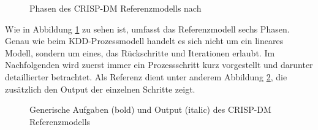 \begin{figure}[H]
\centering
{}
\caption{Phasen des CRISP-DM Referenzmodells nach \citep[S.~10]{chapman_crisp-dm_2000}}
\label{fig:CRISP_DM}
\end{figure}

Wie in Abbildung \ref{fig:CRISP_DM} zu sehen ist, umfasst das Referenzmodell sechs Phasen. Genau wie beim KDD-Prozessmodell handelt es sich nicht um ein lineares Modell, sondern um eines, das Rückschritte und Iterationen erlaubt. Im Nachfolgenden wird zuerst immer ein Prozessschritt kurz vorgestellt und darunter detaillierter betrachtet. Als Referenz dient unter anderem Abbildung \ref{fig:CRISP_DM_detailed}, die zusätzlich den Output der einzelnen Schritte zeigt.

\begin{figure}[H]
\centering
{}
\caption{Generische Aufgaben (bold) und Output (italic) des CRISP-DM Referenzmodells \citep[S.~12]{chapman_crisp-dm_2000}}
\label{fig:CRISP_DM_detailed}
\end{figure}

